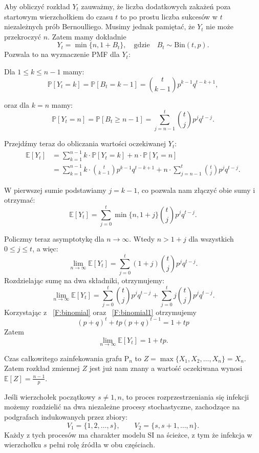 Aby obliczyć rozkład $Y_t$ zauważmy, że liczba dodatkowych zakażeń poza startowym wierzchołkiem do czasu $t$ to po prostu liczba sukcesów w $t$ niezależnych prób Bernoulliego. Musimy jednak pamiętać, że $Y_t$ nie może przekroczyć $n$. Zatem mamy dokładnie
\[
Y_t = \min\{n, 1 + B_t\}, \quad \text{gdzie} \quad B_t \sim \mathrm{Bin}(t,p).
\]
Pozwala to na wyznaczenie PMF dla $Y_t$:

Dla $1 \le k \le n-1$ mamy:
\[
\mathbb{P}[Y_t=k] = \mathbb{P}[B_t=k-1] = \binom{t}{k-1} p^{k-1} q^{t-k+1},
\]  

oraz dla $k = n$ mamy:
\[
\mathbb{P}[Y_t=n] = \mathbb{P}[B_t \ge n-1] = \sum_{j=n-1}^{t} \binom{t}{j} p^j q^{t-j}.
\]

Przejdźmy teraz do obliczania wartości oczekiwanej $Y_t$:
\begin{align*}
\mathbb{E}[Y_t] 
&= \sum_{k=1}^{n-1} k \cdot \mathbb{P}[Y_t=k] + n \cdot \mathbb{P}[Y_t=n] \\
&= \sum_{k=1}^{n-1} k \cdot \binom{t}{k-1} p^{k-1} q^{t-k+1} 
   + n \cdot \sum_{j=n-1}^{t} \binom{t}{j} p^j q^{t-j}.
\end{align*}

W pierwszej sumie podstawiamy $j = k-1$, co pozwala nam złączyć obie sumy i otrzymać:
\[
    \mathbb{E}[Y_t] = \sum_{j=0}^{t} \min\{n, 1+j\} \binom{t}{j} p^j q^{t-j}.
\]

Policzmy teraz asymptotykę dla $n \to \infty$. Wtedy $n > 1 + j$ dla wszystkich $0 \le j \le t$, a więc:
\[
    \lim_{n \to \infty}\mathbb{E}[Y_t] = \sum_{j=0}^{t} (1+j) \binom{t}{j} p^j q^{t-j}.
\]
Rozdzielając sumę na dwa składniki, otrzymujemy:
\[
    \lim_{n \to \infty}\mathbb{E}[Y_t] = \sum_{j=0}^{t} \binom{t}{j} p^j q^{t-j} 
+ \sum_{j=0}^{t} j \binom{t}{j} p^j q^{t-j}.
\]
Korzystając z ~\ref{F:binomial} oraz ~\ref{F:binomial1} otrzymujemy
\[
    (p+q)^t+tp(p+q)^{t-1}=1+tp
\]
Zatem
\[
    \lim_{n \to \infty}\mathbb{E}[Y_t] = 1+tp.
\]

Czas całkowitego zainfekowania grafu $\mathrm{P}_n$ to $Z = \max\{X_1,X_2,\dots,X_n\} = X_n$. Zatem rozkład zmiennej $Z$ jest już nam znany a wartość oczekiwana wynosi $\mathbb{E}[Z]=\frac{n-1}{p}$.

\noindent
Jeśli wierzchołek początkowy $s \ne 1, n$, to proces rozprzestrzeniania się infekcji możemy rozdzielić na dwa niezależne procesy stochastyczne, 
zachodzące na podgrafach indukowanych przez zbiory:
\[
V_1 = \{1, 2, \dots, s\}, \qquad 
V_2 = \{s, s+1, \dots, n\}.
\]
Każdy z tych procesów ma charakter modelu SI na ścieżce, 
z tym że infekcja w wierzchołku $s$ pełni rolę źródła w obu częściach.


